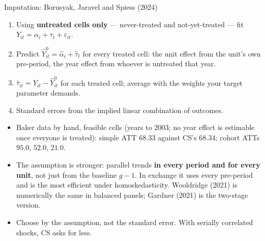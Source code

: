 \documentclass[
  11pt,
  ignorenonframetext,
  aspectratio=169,
]{beamer}
\providecommand{\tightlist}{%
  \setlength{\itemsep}{0pt}\setlength{\parskip}{0pt}}
\begin{document}
\begin{frame}{Imputation: Borusyak, Jaravel and Spiess (2024)}
\protect{}\label{imputation-borusyak-jaravel-and-spiess-2024}
\begin{enumerate}
\tightlist
\item
  Using \textbf{untreated cells only} --- never-treated and
  not-yet-treated --- fit
  \(Y_{it} = \alpha_i + \tau_t + \varepsilon_{it}\).
\item
  Predict \(\hat Y^0_{it} = \hat\alpha_i + \hat\tau_t\) for every
  treated cell: the unit effect from the unit's own pre-period, the year
  effect from whoever is untreated that year.
\item
  \(\hat\tau_{it} = Y_{it} - \hat Y^0_{it}\) for each treated cell;
  average with the weights your target parameter demands.
\item
  Standard errors from the implied linear combination of outcomes.
\end{enumerate}

\begin{itemize}
\tightlist
\item
  Baker data by hand, feasible cells (years to 2003; no year effect is
  estimable once everyone is treated): simple ATT \(68.33\) against CS's
  \(68.34\); cohort ATTs \(95.0\), \(52.0\), \(21.0\).
\item
  The assumption is stronger: parallel trends \textbf{in every period
  and for every unit}, not just from the baseline \(g-1\). In exchange
  it uses every pre-period and is the most efficient under
  homoskedasticity. Wooldridge (2021) is numerically the same in
  balanced panels; Gardner (2021) is the two-stage version.
\item
  Choose by the assumption, not the standard error. With serially
  correlated shocks, CS asks for less.
\end{itemize}
\end{frame}
\end{document}
